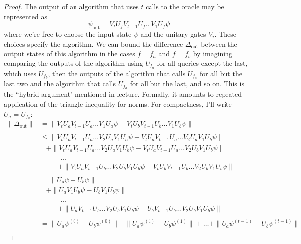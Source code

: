 \documentclass[]{article}
\newcommand{\norm}[1]{\|#1\|}
\theoremstyle{plain}
\theoremstyle{definition}
\theoremstyle{remark}
\begin{document}
\begin{proof}
The output of an algorithm that uses $t$ calls to the oracle may be represented as
\begin{equation}
\psi_\text{out}=V_tU_fV_{t-1}U_f\ldots V_1U_f\psi
\end{equation}
where we're free to choose the input state $\psi$ and the unitary gates $V_i$. These choices specify the algorithm. We can bound the difference $\Delta_\text{out}$ between the output states of this algorithm in the cases $f=f_a$ and $f=f_b$ by imagining comparing the outputs of the algorithm using $U_{f_a}$ for all queries except the last, which uses $U_{f_b}$, then the outputs of the algorithm that calls $U_{f_a}$ for all but the last two and the algorithm that calls $U_{f_a}$ for all but the last, and so on. This is the ``hybrid argument" mentioned in lecture. Formally, it amounts to repeated application of the triangle inequality for norms. For compactness, I'll write $U_a=U_{f_a}$:
\begin{equation}
\begin{aligned}
\norm{\Delta_\text{out}}&=\norm{V_tU_aV_{t-1}U_a\ldots V_1U_a\psi-V_tU_bV_{t-1}U_b\ldots V_1U_b\psi}\\
\\
&\leq \norm{V_tU_aV_{t-1}U_a\ldots V_2U_aV_1U_a\psi-V_tU_aV_{t-1}U_a\ldots V_2U_aV_1U_b\psi}\\
&\hspace{10pt}+\norm{V_tU_aV_{t-1}U_a\ldots V_2U_aV_1U_b\psi-V_tU_aV_{t-1}U_a\ldots V_2U_bV_1U_b\psi}\\
&\hspace{20pt}+\ldots\\
&\hspace{30pt}+\norm{V_tU_aV_{t-1}U_b\ldots V_2U_bV_1U_b\psi-V_tU_bV_{t-1}U_b\ldots V_2U_bV_1U_b\psi}\\
\\
&=\norm{U_a\psi-U_b\psi}\\
&\hspace{10pt}+\norm{U_aV_1U_b\psi-U_bV_1U_b\psi}\\
&\hspace{20pt}+\ldots\\
&\hspace{30pt}+\norm{U_aV_{t-1}U_b\ldots V_2U_bV_1U_b\psi-U_bV_{t-1}U_b\ldots V_2U_bV_1U_b\psi}\\
\\
&=\norm{U_a\psi^{(0)}-U_b\psi^{(0)}}+\norm{U_a\psi^{(1)}-U_b\psi^{(1)}}+\ldots+\norm{U_a\psi^{(t-1)}-U_b\psi^{(t-1)}}\\

\end{aligned}
\end{equation}
\end{proof}
\end{document}
